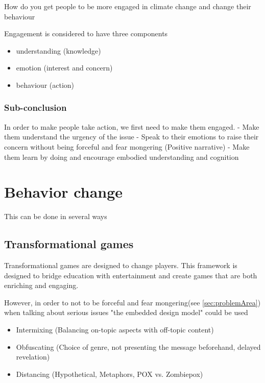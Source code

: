     How do you get people to be more engaged in climate change and change their behaviour\cite{storyAboutClimateChange}

    
    Engagement is considered to have three components \cite{reorientingClimageChangeCommunication}\cite{vrEngagementClimateChange}
    \begin{itemize}
        \item understanding (knowledge) 
        \item emotion (interest and concern)
        \item behaviour (action)
    \end{itemize}

    \subsubsection{Sub-conclusion}
    In order to make people take action, we first need to make them engaged.
    - Make them understand the urgency of the issue
    - Speak to their emotions to raise their concern without being forceful and fear mongering (Positive narrative)
    - Make them learn by doing and encourage embodied understanding and cognition

\section{Behavior change}\label{sec:behaviourChange}
    This can be done in several ways
    
    \subsection{Transformational games}
    Transformational games are designed to change players. This framework is designed to bridge education with entertainment and create games that are both enriching and engaging\cite{transformationalFramework}.
    
    However, in order to not to be forceful and fear mongering(see \autoref{sec:problemArea}) when talking about serious issues "the embedded design model" could be used\cite{embeddedDesignModel}
    \begin{itemize}
        \item Intermixing (Balancing on-topic aspects with off-topic content)
        \item Obfuscating (Choice of genre, not presenting the message beforehand, delayed revelation)
        \item Distancing (Hypothetical, Metaphors, POX vs. Zombiepox)
    \end{itemize}
    
